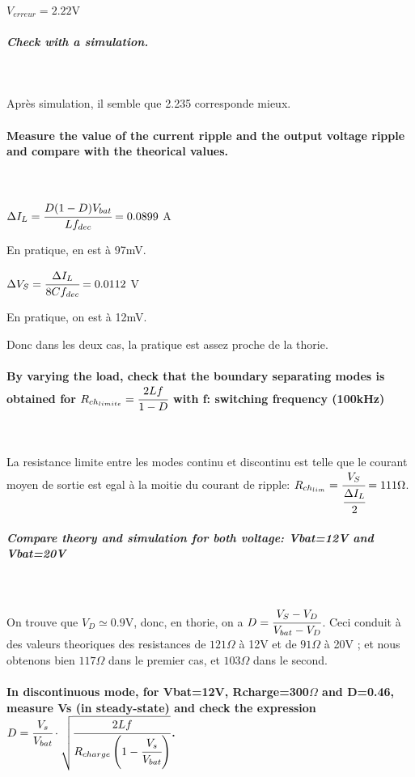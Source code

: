 \documentclass{article}
\begin{document}
~

$V_{erreur}=2.22$V

\subparagraph{Check with a simulation.}

~

Après simulation, il semble que 2.235 corresponde mieux.


\paragraph{Measure the value of the current ripple and the output voltage ripple and compare with the theorical values.}

~

$\Delta I_L = \cfrac{D(1-D)V_{bat}}{Lf_{dec}} = 0.0899$ A

En pratique, en est à 97mV.

$\Delta V_S = \cfrac{\Delta I_L}{8Cf_{dec}} = 0.0112$ V

En pratique, on est à 12mV.

Donc dans les deux cas, la pratique est assez proche de la thorie.

\paragraph{By varying the load, check that the boundary separating modes is obtained for $R_{ch_{limite}} = \cfrac{2Lf}{1-D}$ with f: switching frequency (100kHz)}

~

La resistance limite entre les modes continu et discontinu est telle que le courant moyen de sortie est egal à la moitie du courant de ripple:
$R_{ch_{lim}} = \cfrac{V_S}{\cfrac{\Delta I_L}{2}} = 111\Omega$.

\subparagraph{Compare theory and simulation for both voltage: Vbat=12V and Vbat=20V}

~

On trouve que $V_D \simeq 0.9$V, donc, en thorie, on a $D = \cfrac{V_S-V_D}{V_{bat}-V_D}$.
Ceci conduit à des valeurs theoriques des resistances de $121 \Omega$ à 12V et de $91 \Omega$ à 20V ; et nous obtenons bien $117\Omega$ dans le premier cas, et $103\Omega$ dans le second.


\paragraph{In discontinuous mode, for Vbat=12V, Rcharge=300$\Omega$ and D=0.46, measure Vs (in steady-state) and check the expression
    $D=\cfrac{V_s}{V_{bat}}\cdot\sqrt{\cfrac{2Lf}{R_{charge}\left(1-\cfrac{V_s}{V_{bat}}\right)}}$.}
\end{document}
